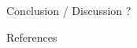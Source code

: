 \documentclass[final]{beamer}
\newlength{\sepwidth}
\newlength{\colwidth}
\newcommand{\separatorcolumn}{\begin{column}{\sepwidth}\end{column}}
\begin{document}
\begin{frame}[t]
\begin{columns}[t]
\begin{column}{\colwidth}
\begin{block}{Conclusion / Discussion ?}
      \end{block}

      \begin{block}{References}

        \nocite{*}
        \footnotesize{}

      \end{block}

    \end{column}

    \separatorcolumn
  \end{columns}
\end{frame}
\end{document}
